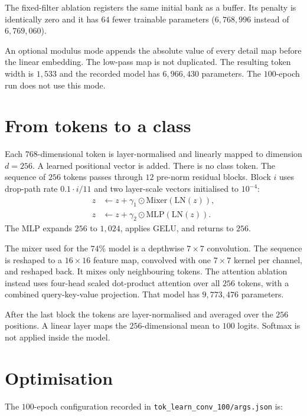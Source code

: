 \documentclass[11pt]{article}
\begin{document}
The fixed-filter ablation registers the same initial bank as a buffer. Its
penalty is identically zero and it has $64$ fewer trainable parameters
($6{,}768{,}996$ instead of $6{,}769{,}060$).

An optional modulus mode appends the absolute value of every detail map before
the linear embedding. The low-pass map is not duplicated. The resulting token
width is $1{,}533$ and the recorded model has $6{,}966{,}430$ parameters. The
$100$-epoch run does not use this mode.

\section{From tokens to a class}

Each $768$-dimensional token is layer-normalised and linearly mapped to
dimension $d=256$. A learned positional vector is added. There is no class
token. The sequence of $256$ tokens passes through $12$ pre-norm residual
blocks. Block $i$ uses drop-path rate $0.1\cdot i/11$ and two layer-scale
vectors initialised to $10^{-4}$:
\begin{equation}
\begin{aligned}
z &\leftarrow z + \gamma_1\odot \mathrm{Mixer}(\mathrm{LN}(z)),\\
z &\leftarrow z + \gamma_2\odot \mathrm{MLP}(\mathrm{LN}(z)).
\end{aligned}
\end{equation}
The MLP expands $256$ to $1{,}024$, applies GELU, and returns to $256$.

The mixer used for the $74\%$ model is a depthwise $7\times7$ convolution. The
sequence is reshaped to a $16\times16$ feature map, convolved with one
$7\times7$ kernel per channel, and reshaped back. It mixes only neighbouring
tokens. The attention ablation instead uses four-head scaled dot-product
attention over all $256$ tokens, with a combined query-key-value projection.
That model has $9{,}773{,}476$ parameters.

After the last block the tokens are layer-normalised and averaged over the
$256$ positions. A linear layer maps the $256$-dimensional mean to $100$
logits. Softmax is not applied inside the model.

\section{Optimisation}

The $100$-epoch configuration recorded in
\texttt{tok\_learn\_conv\_100/args.json} is:
\end{document}
